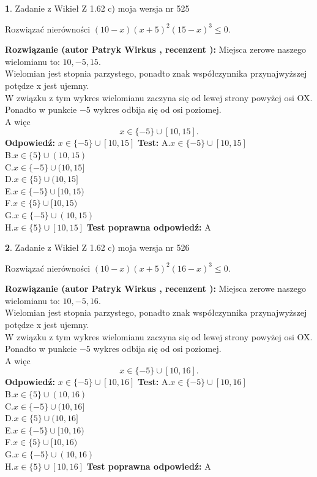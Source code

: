 \documentclass[12pt, a4paper]{article}
\theoremstyle{definition} %
\newtheorem{zad}{}
\newcommand{\zadStart}[1]{\begin{zad}#1\newline}
\newcommand{\zadStop}{\end{zad}}
\newcommand{\rozwStart}[2]{\noindent \textbf{Rozwiązanie (autor #1 , recenzent #2): }\newline}
\newcommand{\rozwStop}{\newline}
\newcommand{\odpStart}{\noindent \textbf{Odpowiedź:}\newline}
\newcommand{\odpStop}{\newline}
\newcommand{\testStart}{\noindent \textbf{Test:}\newline}
\newcommand{\testStop}{\newline}
\newcommand{\kluczStart}{\noindent \textbf{Test poprawna odpowiedź:}\newline}
\newcommand{\kluczStop}{\newline}
\begin{document}
\zadStart{Zadanie z Wikieł Z 1.62 c) moja wersja nr 525}

Rozwiązać nierówności $(10-x)(x+5)^{2}(15-x)^{3}\le0$.
\zadStop
\rozwStart{Patryk Wirkus}{}
Miejsca zerowe naszego wielomianu to: $10, -5, 15$.\\
Wielomian jest stopnia parzystego, ponadto znak współczynnika przy\linebreak najwyższej potędze x jest ujemny.\\ W związku z tym wykres wielomianu zaczyna się od lewej strony powyżej osi OX.\\
Ponadto w punkcie $-5$ wykres odbija się od osi poziomej.\\
A więc $$x \in \{-5\} \cup [10,15].$$
\rozwStop
\odpStart
$x \in \{-5\} \cup [10,15]$
\odpStop
\testStart
A.$x \in \{-5\} \cup [10,15]$\\
B.$x \in \{5\} \cup (10,15)$\\
C.$x \in \{-5\} \cup (10,15]$\\
D.$x \in \{5\} \cup (10,15]$\\
E.$x \in \{-5\} \cup [10,15)$\\
F.$x \in \{5\} \cup [10,15)$\\
G.$x \in \{-5\} \cup (10,15)$\\
H.$x \in \{5\} \cup [10,15]$
\testStop
\kluczStart
A
\kluczStop



\zadStart{Zadanie z Wikieł Z 1.62 c) moja wersja nr 526}

Rozwiązać nierówności $(10-x)(x+5)^{2}(16-x)^{3}\le0$.
\zadStop
\rozwStart{Patryk Wirkus}{}
Miejsca zerowe naszego wielomianu to: $10, -5, 16$.\\
Wielomian jest stopnia parzystego, ponadto znak współczynnika przy\linebreak najwyższej potędze x jest ujemny.\\ W związku z tym wykres wielomianu zaczyna się od lewej strony powyżej osi OX.\\
Ponadto w punkcie $-5$ wykres odbija się od osi poziomej.\\
A więc $$x \in \{-5\} \cup [10,16].$$
\rozwStop
\odpStart
$x \in \{-5\} \cup [10,16]$
\odpStop
\testStart
A.$x \in \{-5\} \cup [10,16]$\\
B.$x \in \{5\} \cup (10,16)$\\
C.$x \in \{-5\} \cup (10,16]$\\
D.$x \in \{5\} \cup (10,16]$\\
E.$x \in \{-5\} \cup [10,16)$\\
F.$x \in \{5\} \cup [10,16)$\\
G.$x \in \{-5\} \cup (10,16)$\\
H.$x \in \{5\} \cup [10,16]$
\testStop
\kluczStart
A
\kluczStop
\end{document}
